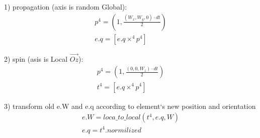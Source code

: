 1) propagation (axis is random Global):
\begin{eqnarray}
  p^4 = (1, \frac{(W_x, W_y, 0) \cdot dt}{2}) \\
  e.q = [e.q \times^4 p^4]
\end{eqnarray}

2) spin (asis is Local $\vec{Oz}$):
\begin{eqnarray}
  p^4 = (1, \frac{(0, 0, W_z) \cdot dt}{2}) \\
  t^4 = [e.q \times^4 p^4]
\end{eqnarray}

3) transform old e.W and e.q according to element`s new position and orientation
\begin{eqnarray}
  e.W = loca\_to\_local( t^4, e.q, W ) \\
  e.q = t^4.normilized
\end{eqnarray}
